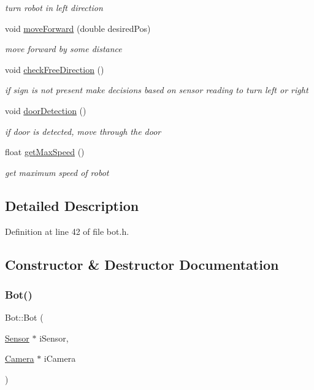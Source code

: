 \begin{DoxyCompactItemize}
\begin{DoxyCompactList}\small\item\em turn robot in left direction \end{DoxyCompactList}\item 
void \mbox{\hyperlink{class_bot_abc25556b72a44e45056d161eaa48e1c6}{move\+Forward}} (double desired\+Pos)
\begin{DoxyCompactList}\small\item\em move forward by some distance \end{DoxyCompactList}\item 
void \mbox{\hyperlink{class_bot_ab20d03ffaf12e27a1ee84714a3e83950}{check\+Free\+Direction}} ()
\begin{DoxyCompactList}\small\item\em if sign is not present make decisions based on sensor reading to turn left or right \end{DoxyCompactList}\item 
void \mbox{\hyperlink{class_bot_a308e7e40f00a853d1397cfafcb7d2cd5}{door\+Detection}} ()
\begin{DoxyCompactList}\small\item\em if door is detected, move through the door \end{DoxyCompactList}\item 
float \mbox{\hyperlink{class_bot_a4a3b192232d8b938f11c1d253795c222}{get\+Max\+Speed}} ()
\begin{DoxyCompactList}\small\item\em get maximum speed of robot \end{DoxyCompactList}\end{DoxyCompactItemize}


\subsection{Detailed Description}


Definition at line 42 of file bot.\+h.



\subsection{Constructor \& Destructor Documentation}
\mbox{\label{class_bot_a14b4bfcbda8c051d8447e73073567b50}} 
\subsubsection{\texorpdfstring{Bot()}{Bot()}}
{\footnotesize\ttfamily Bot\+::\+Bot (\begin{DoxyParamCaption}\item[{\mbox{\hyperlink{class_sensor}{Sensor}} $\ast$}]{i\+Sensor,  }\item[{\mbox{\hyperlink{class_camera}{Camera}} $\ast$}]{i\+Camera }\end{DoxyParamCaption})}



